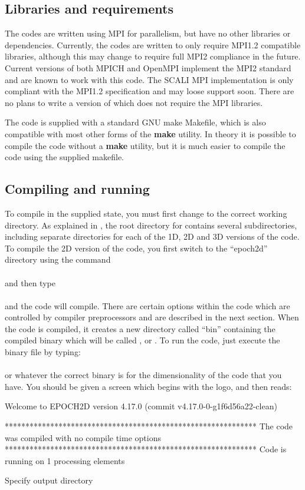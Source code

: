 \subsection{Libraries and requirements}
The {\EPOCH} codes are written using MPI for parallelism, but have no other
libraries or dependencies. Currently, the codes are written to only require
MPI1.2 compatible libraries, although this may change to require full MPI2
compliance in the future. Current versions of both MPICH and OpenMPI implement
the MPI2 standard and are known to work with this code. The SCALI MPI
implementation is only compliant with the MPI1.2 specification and may loose
support soon.
There are no plans to write a version of {\EPOCH} which does not require
the MPI libraries.

The code is supplied with a standard GNU make Makefile, which is also
compatible with most other forms of the {\bf make} utility. In theory it is
possible to compile the code without a {\bf make} utility, but it is much
easier to compile the code using the supplied makefile.

\subsection{\texorpdfstring
  {Compiling and running {\EPOCH}}
  {Compiling and running {EPOCH}}}

To compile {\EPOCH} in the supplied state, you must first change to the
correct working directory. As explained in , the
root directory for {\EPOCH} contains several subdirectories, including
separate directories for each of the 1D, 2D and 3D versions of the code.
To compile the 2D version of the code, you first switch to the ``epoch2d''
directory using the command\\
\indent{}\\
and then type\\
\indent{}\\
and the code will compile. There are certain options within the code which are
controlled by compiler preprocessors and are described in the next
section. When the code is compiled, it creates a new directory called ``bin''
containing the compiled binary which will be called ,
 or . To run the code, just execute the
binary file by typing:\\
\indent{}\\
or whatever the correct binary is for the dimensionality of the code that you
have. You should be given a screen which begins with the {\EPOCH} logo, and then
reads:
\begin{boxverbatim}
 Welcome to EPOCH2D version 4.17.0   (commit v4.17.0-0-g1f6d56a22-clean)

 *************************************************************
 The code was compiled with no compile time options
 *************************************************************
 Code is running on 1 processing elements

 Specify output directory
\end{boxverbatim}

